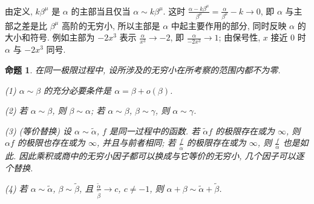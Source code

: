 \documentclass[UTF8,openany]{ctexbook}
\theoremstyle{chinesetextbook}
\newtheorem{proposition}{命题}[section]
\begin{document}
由定义, $k\beta^\mu$ 是 $\alpha$ 的主部当且仅当 $\alpha\sim k\beta^\mu$. 这时 $\displaystyle\frac{\alpha-k\beta^\mu}{\beta^\mu}=\frac\alpha{\beta^\mu}-k\to0$, 即 $\alpha$ 与主部之差是比 $\beta^\mu$ 高阶的无穷小, 所以主部是 $\alpha$ 中起主要作用的部分, 同时反映 $\alpha$ 的大小和符号. 例如主部为 $-2x^3$ 表示 $\displaystyle\frac\alpha{x^3}\to-2$, 即 $\displaystyle\frac\alpha{-2x^3}\to1$; 由保号性, $x$ 接近 $0$ 时 $\alpha$ 与 $-2x^3$ 同号.
\begin{proposition}
在同一极限过程中, 设所涉及的无穷小在所考察的范围内都不为零.

\textup{(1)} $\alpha\sim\beta$ 的充分必要条件是 $\alpha=\beta+o(\beta)$.

\textup{(2)} 若 $\alpha\sim\beta$, 则 $\beta\sim\alpha$; 若 $\alpha\sim\beta$, $\beta\sim\gamma$, 则 $\alpha\sim\gamma$.

\textup{(3)} (等价替换) 设 $\alpha\sim\widetilde\alpha$, $f$ 是同一过程中的函数. 若 $\widetilde\alpha f$ 的极限存在或为 $\infty$, 则 $\alpha f$ 的极限也存在或为 $\infty$, 并且与前者相同; 若 $\displaystyle\frac f{\widetilde\alpha}$ 的极限存在或为 $\infty$, 则 $\displaystyle\frac f\alpha$ 也是如此. 因此乘积或商中的无穷小因子都可以换成与它等价的无穷小, 几个因子可以逐个替换.

\textup{(4)} 若 $\alpha\sim\widetilde\alpha$, $\beta\sim\widetilde\beta$, 且 $\displaystyle\frac{\widetilde\alpha}{\widetilde\beta}\to c$, $c\ne-1$, 则 $\alpha+\beta\sim\widetilde\alpha+\widetilde\beta$.
\end{proposition}
\end{document}
